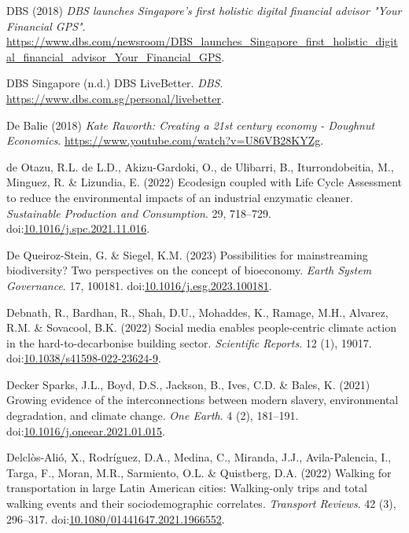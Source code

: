 \documentclass[
  letterpaper,
  DIV=11,
  numbers=noendperiod]{scrartcl}
\newlength{\cslhangindent}
\newenvironment{CSLReferences}[2] %
 {\begin{list}{}{%
  \setlength{\itemindent}{0pt}
  \setlength{\leftmargin}{0pt}
  \setlength{\parsep}{0pt}
  \ifodd #1
   \setlength{\leftmargin}{\cslhangindent}
   \setlength{\itemindent}{-1\cslhangindent}
  \fi
  \setlength{\itemsep}{#2\baselineskip}}}
 {\end{list}}
\begin{document}
\begin{CSLReferences}{0}{1}
DBS (2018) \emph{{DBS} launches {Singapore}'s first holistic digital
financial advisor "{Your Financial GPS}"}.
\url{https://www.dbs.com/newsroom/DBS_launches_Singapore_first_holistic_digital_financial_advisor_Your_Financial_GPS}.

DBS Singapore (n.d.) {DBS LiveBetter}. \emph{DBS}.
\url{https://www.dbs.com.sg/personal/livebetter}.

De Balie (2018) \emph{Kate {Raworth}: {Creating} a 21st century economy
- {Doughnut Economics}}.
\url{https://www.youtube.com/watch?v=U86VB28KYZg}.

de Otazu, R.L. de L.D., Akizu-Gardoki, O., de Ulibarri, B.,
Iturrondobeitia, M., Minguez, R. \& Lizundia, E. (2022) Ecodesign
coupled with {Life Cycle Assessment} to reduce the environmental impacts
of an industrial enzymatic cleaner. \emph{Sustainable Production and
Consumption}. 29, 718--729.
doi:\href{https://doi.org/10.1016/j.spc.2021.11.016}{10.1016/j.spc.2021.11.016}.

De Queiroz-Stein, G. \& Siegel, K.M. (2023) Possibilities for
mainstreaming biodiversity? {Two} perspectives on the concept of
bioeconomy. \emph{Earth System Governance}. 17, 100181.
doi:\href{https://doi.org/10.1016/j.esg.2023.100181}{10.1016/j.esg.2023.100181}.

Debnath, R., Bardhan, R., Shah, D.U., Mohaddes, K., Ramage, M.H.,
Alvarez, R.M. \& Sovacool, B.K. (2022) Social media enables
people-centric climate action in the hard-to-decarbonise building
sector. \emph{Scientific Reports}. 12 (1), 19017.
doi:\href{https://doi.org/10.1038/s41598-022-23624-9}{10.1038/s41598-022-23624-9}.

Decker Sparks, J.L., Boyd, D.S., Jackson, B., Ives, C.D. \& Bales, K.
(2021) Growing evidence of the interconnections between modern slavery,
environmental degradation, and climate change. \emph{One Earth}. 4 (2),
181--191.
doi:\href{https://doi.org/10.1016/j.oneear.2021.01.015}{10.1016/j.oneear.2021.01.015}.

Delclòs-Alió, X., Rodríguez, D.A., Medina, C., Miranda, J.J.,
Avila-Palencia, I., Targa, F., Moran, M.R., Sarmiento, O.L. \&
Quistberg, D.A. (2022) Walking for transportation in large {Latin
American} cities: Walking-only trips and total walking events and their
sociodemographic correlates. \emph{Transport Reviews}. 42 (3), 296--317.
doi:\href{https://doi.org/10.1080/01441647.2021.1966552}{10.1080/01441647.2021.1966552}.


\end{CSLReferences}
\end{document}
